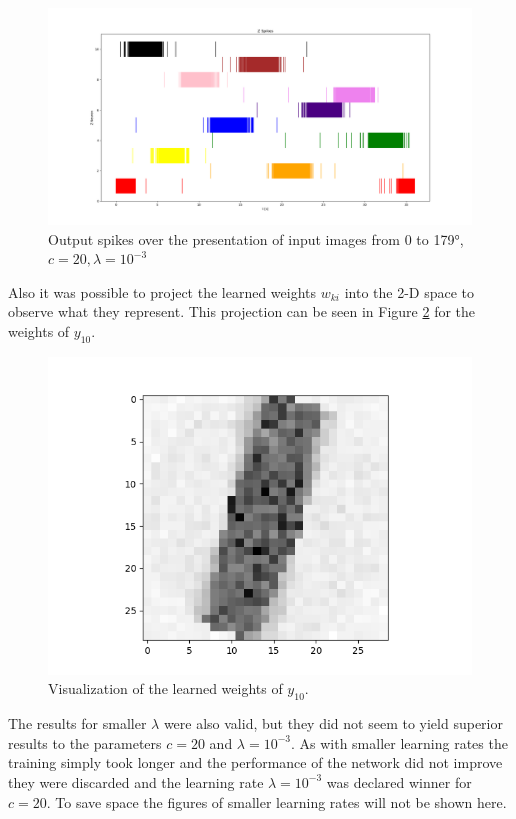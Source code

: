 \begin{figure}
  \includegraphics[width=\linewidth]{figures/angleNetwork/c20_3validationZSpikes.png}
  \caption{Output spikes over the presentation of input images from 0 to 179°, $c = 20, \lambda = 10^{-3}$}
  \label{fig:c20_3validationZSpikes}
\end{figure}

Also it was possible to project the learned weights $w_{ki}$ into the 2-D space to observe what they represent. This projection can be seen in Figure \ref{fig:c20_3weights2.png} for the weights of $y_{10}$.

\begin{figure}
  \includegraphics[width=\linewidth]{figures/angleNetwork/c20_3weights2.png}
  \caption{Visualization of the learned weights of $y_{10}$.}
  \label{fig:c20_3weights2.png}
\end{figure}

The results for smaller $\lambda$ were also valid, but they did not seem to yield superior results to the parameters $c = 20$ and $\lambda = 10^{-3}$. As with smaller learning rates the training simply took longer and the performance of the network did not improve they were discarded and  the learning rate $\lambda = 10^{-3}$ was declared winner for $c = 20$. To save space the figures of smaller learning rates will not be shown here.

